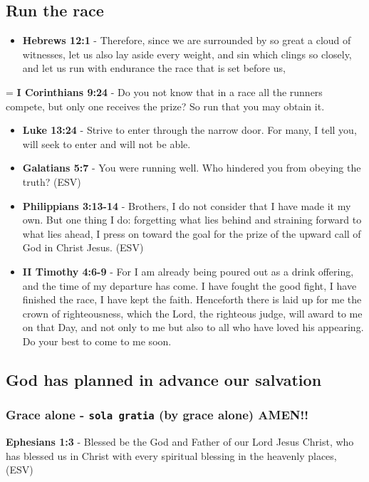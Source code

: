 \documentclass[11pt]{article}
\begin{document}
\subsection{Run the race}
\label{sec:org8641039}
\begin{itemize}
\item \textbf{Hebrews 12:1} - Therefore, since we are surrounded by so great a cloud of witnesses, let us also lay aside every weight, and sin which clings so closely, and let us run with endurance the race that is set before us,
\end{itemize}
= \textbf{I Corinthians 9:24} - Do you not know that in a race all the runners compete, but only one receives the prize? So run that you may obtain it.
\begin{itemize}
\item \textbf{Luke 13:24} - Strive to enter through the narrow door. For many, I tell you, will seek to enter and will not be able.
\item \textbf{Galatians 5:7} - You were running well. Who hindered you from obeying the truth? (ESV)
\item \textbf{Philippians 3:13-14} - Brothers, I do not consider that I have made it my own. But one thing I do: forgetting what lies behind and straining forward to what lies ahead, I press on toward the goal for the prize of the upward call of God in Christ Jesus. (ESV)
\item \textbf{II Timothy 4:6-9} - For I am already being poured out as a drink offering, and the time of my departure has come. I have fought the good fight, I have finished the race, I have kept the faith. Henceforth there is laid up for me the crown of righteousness, which the Lord, the righteous judge, will award to me on that Day, and not only to me but also to all who have loved his appearing. Do your best to come to me soon.
\end{itemize}

\subsection{God has planned in advance our salvation}
\label{sec:org4028f2a}
\subsubsection{Grace alone - \texttt{sola gratia} (by grace alone) AMEN!!}
\label{sec:org9ac075c}
\textbf{Ephesians 1:3} - Blessed be the God and Father of our Lord Jesus Christ, who has blessed us in Christ with every spiritual blessing in the heavenly places, (ESV)
\end{document}
